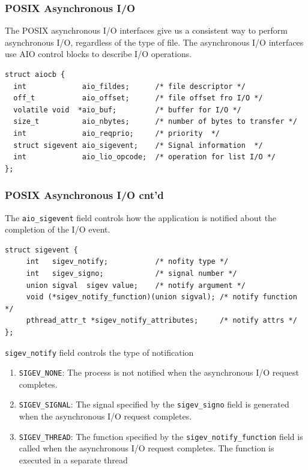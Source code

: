 \documentclass[newPxFont,sthlmFooter,nooffset]{beamer}
\begin{document}
\begin{frame}[fragile,t]
  \frametitle{POSIX Asynchronous I/O}
The POSIX asynchronous I/O interfaces give us a consistent way to perform asynchronous I/O, regardless of the type of file.
\bigskip
The asynchronous I/O interfaces use AIO control blocks to describe I/O operations.

\begin{verbatim}
struct aiocb {
  int             aio_fildes;      /* file descriptor */
  off_t           aio_offset;      /* file offset fro I/O */
  volatile void  *aio_buf;         /* buffer for I/O */
  size_t          aio_nbytes;      /* number of bytes to transfer */
  int             aio_reqprio;     /* priority  */
  struct sigevent aio_sigevent;    /* Signal information  */
  int             aio_lio_opcode;  /* operation for list I/O */
};
\end{verbatim}
\end{frame}

\begin{frame}[fragile,t]
  \frametitle{POSIX Asynchronous I/O cnt'd}
The \texttt{aio\_sigevent} field controls how the application is notified about the completion of the I/O event.
{\footnotesize
\begin{verbatim}
struct sigevent {
     int   sigev_notify;           /* nofity type */
     int   sigev_signo;            /* signal number */
     union sigval  sigev value;    /* notify argument */
     void (*sigev_notify_function)(union sigval); /* notify function */
     pthread_attr_t *sigev_notify_attributes;     /* notify attrs */
};
\end{verbatim}

\texttt{sigev\_notify} field controls the type of notification
\begin{enumerate}
\item \texttt{SIGEV\_NONE}: The process is not notified when the asynchronous I/O request completes.
\item \texttt{SIGEV\_SIGNAL}: The signal specified by the \texttt{sigev\_signo} field is generated when the asynchronous I/O request completes.
\item \texttt{SIGEV\_THREAD}: The function specified by the \texttt{sigev\_notify\_function} field is called when the asynchronous I/O request completes. The function is executed in a separate thread
\end{enumerate}
}
\end{frame}
\end{document}

